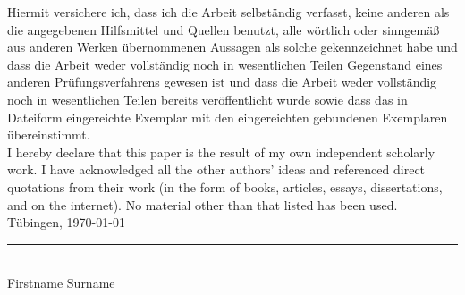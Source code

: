 \documentclass[12pt,a4paper]{article}
\numberwithin{figure}{section}
\numberwithin{table}{section}
\numberwithin{definition}{section}
\begin{document}


\noindent

Hiermit versichere ich, dass ich die Arbeit selbständig verfasst, keine anderen als die angegebenen Hilfsmittel und Quellen benutzt, alle wörtlich oder sinngemäß aus anderen Werken übernommenen Aussagen als solche gekennzeichnet habe und dass die Arbeit weder vollständig noch in wesentlichen Teilen Gegenstand eines anderen Prüfungsverfahrens gewesen ist und dass die Arbeit weder vollständig noch in wesentlichen Teilen bereits veröffentlicht wurde sowie dass das in Dateiform eingereichte Exemplar mit den eingereichten gebundenen Exemplaren übereinstimmt.\\[4em]
I hereby declare that this paper is the result of my own independent scholarly work.
I have acknowledged all the other authors' ideas and referenced direct quotations
from their work (in the form of books, articles, essays, dissertations, and on the
internet). No material other than that listed has been used.
\\[18mm]
T\"ubingen, \today \hspace{6.0cm} \\%
\begin{flushright}

\rule{0.4\textwidth}{0.2pt}\\
Firstname Surname
\end{flushright}
\pagestyle{empty}
\newpage

% 
\newpage

\tableofcontents
\thispagestyle{empty}
\onehalfspacing

\pagestyle{empty}

\newpage

\newpage


\listoffigures
\listoftables


\end{document}
